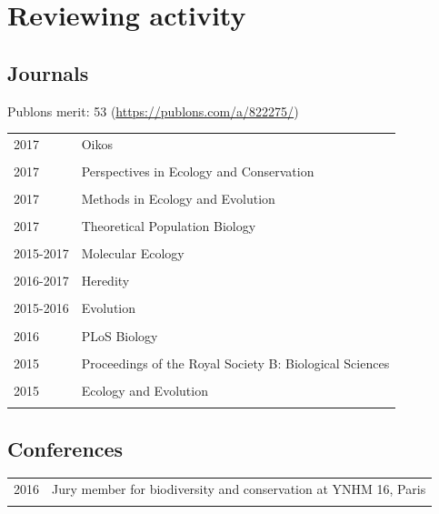 \documentclass[a4paper,10pt]{article} %
\begin{document}
\section*{Reviewing activity}
\subsection*{Journals}
Publons merit: 53 (\url{https://publons.com/a/822275/})
\begin{table}[h]
\begin{tabular}{p{4cm}|p{11cm}}
\hfill \textsc{2017} & Oikos\\
\multicolumn{2}{c}{} \\
\hfill \textsc{2017} & Perspectives in Ecology and Conservation\\
\multicolumn{2}{c}{} \\
\hfill \textsc{2017} & Methods in Ecology and Evolution\\
\multicolumn{2}{c}{} \\
\hfill \textsc{2017} & Theoretical Population Biology\\
\multicolumn{2}{c}{} \\
\hfill \textsc{2015-2017} & Molecular Ecology\\
\multicolumn{2}{c}{} \\
\hfill \textsc{2016-2017} & Heredity\\
\multicolumn{2}{c}{} \\
\hfill \textsc{2015-2016} & Evolution\\
\multicolumn{2}{c}{} \\
\hfill \textsc{2016} & PLoS Biology\\
\multicolumn{2}{c}{} \\
\hfill \textsc{2015} & Proceedings of the Royal Society B: Biological Sciences\\
\multicolumn{2}{c}{} \\
\hfill \textsc{2015} & Ecology and Evolution\\
\multicolumn{2}{c}{} \\
\end{tabular}
\end{table}

\subsection*{Conferences}
\begin{tabular}{p{4cm}|p{11cm}}
\hfill \textsc{2016} & Jury member for biodiversity and conservation at YNHM 16, Paris\\
\multicolumn{2}{c}{} \\
\end{tabular}
\end{document}
